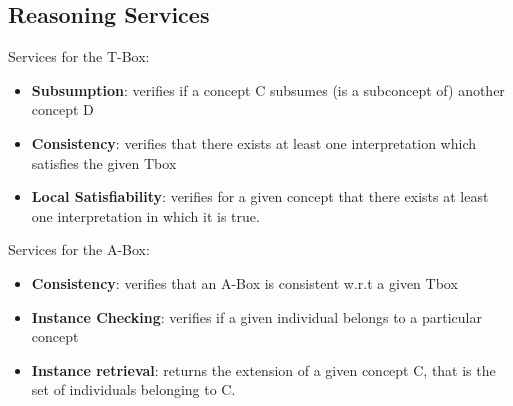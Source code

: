 \documentclass[10pt,a4paper]{article}
\begin{document}
\begin{justify}
\subsection{Reasoning Services}
Services for the T-Box:
\begin{itemize}
	\item \textbf{Subsumption}: verifies if a concept C subsumes (is a subconcept of) another concept D
	\item \textbf{Consistency}: verifies that there exists at least one interpretation which satisfies the given Tbox
	\item \textbf{Local Satisfiability}: verifies for a given concept that there exists at least one interpretation in which it is true.
\end{itemize}
Services for the A-Box:
\begin{itemize}
	\item \textbf{Consistency}: verifies that an A-Box is consistent w.r.t a given Tbox
	\item \textbf{Instance Checking}: verifies if a given individual belongs to a particular concept
	\item \textbf{Instance retrieval}: returns the extension of a given concept C, that is the set of individuals belonging to C.	
\end{itemize}

\end{justify}
\end{document}
